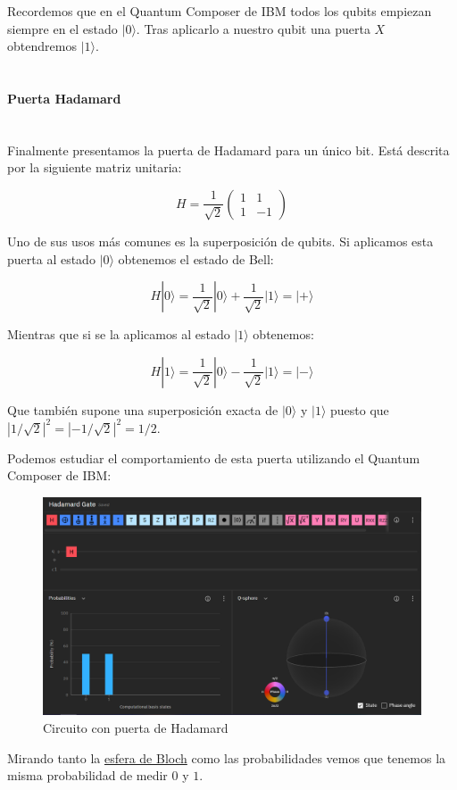 \documentclass[11pt]{article}
\newcommand{\ra}{\rangle}
\newcommand{\myparagraph}[1]{\paragraph*{ \\ #1}\mbox{}\\}
\theoremstyle{plain}
\begin{document}
Recordemos que en el Quantum Composer de IBM todos los qubits empiezan siempre en el estado $|0\ra$. Tras aplicarlo a nuestro qubit una puerta $X$ obtendremos $|1\ra$. \\


\myparagraph{Puerta Hadamard}


Finalmente presentamos la puerta de Hadamard para un único bit. Está descrita por la siguiente matriz unitaria:

\[
	H = \frac{1}{\sqrt 2}
	\begin{pmatrix}
		1 & 1 \\
		1 & -1 
	\end{pmatrix}
\]

Uno de sus usos más comunes es la superposición de qubits. Si aplicamos esta puerta al estado $|0\ra$ obtenemos el estado de Bell:

\[
	H|0\ra = \frac{1}{\sqrt 2} |0\ra + \frac{1}{\sqrt 2} |1\ra = |+\ra
\]

Mientras que si se la aplicamos al estado $|1\ra$ obtenemos:

\[
	H|1\ra = \frac{1}{\sqrt 2} |0\ra - \frac{1}{\sqrt 2} |1\ra = |-\ra
\]

Que también supone una superposición exacta de $|0\ra$ y $|1\ra$ puesto que $|1/\sqrt 2|^2 = |-1/\sqrt 2|^2 = 1/2$.

Podemos estudiar el comportamiento de esta puerta utilizando el Quantum Composer de IBM:

\begin{figure}[H]
	\centering
	\includegraphics[scale=0.5]{figures/gate-hadamard.png}
	\caption{Circuito con puerta de Hadamard}
\end{figure}

Mirando tanto la \href{URL}{esfera de Bloch} como las probabilidades vemos que tenemos la misma probabilidad de medir $0$ y $1$. \\
\end{document}
